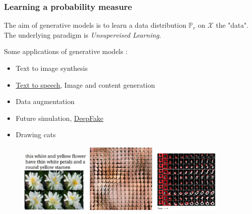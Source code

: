 \documentclass[french,9pt]{beamer}
\begin{document}
\begin{frame}
\frametitle{Learning a probability measure}

The aim of generative models is to learn a data distribution $\mathbb{P}_{r}$ on $\mathcal{X}$ the "data". The underlying paradigm is \emph{Unsupervised Learning}.

Some applications of generative models :
\begin{itemize}

\item Text to image synthesis \cite{DBLP:journals/corr/ReedAYLSL16}
\item \href{https://deepmind.com/blog/wavenet-generative-model-raw-audio/}{Text to speech}, Image and content generation \cite{2015arXiv150204623G}
\item Data augmentation \cite{2017arXiv171104340A}
\item Future simulation, \href{https://www.youtube.com/watch?v=PCBTZh41Ris}{DeepFake} \cite{2018arXiv180807371C}
\item Drawing cats

\end{itemize}

\begin{figure}
  \begin{center}
    \includegraphics[width=0.3\textwidth]{fig/text_to_image.png}\hspace{1mm}
     \includegraphics[width=0.3\textwidth]{fig/data_augm.png}\hspace{1mm}
      \includegraphics[width=0.3\textwidth]{fig/draw.png}
  \end{center}
  \caption{\cite{DBLP:journals/corr/ReedAYLSL16,2017arXiv171104340A,2015arXiv150204623G}}
\end{figure}


\end{frame}
\end{document}
